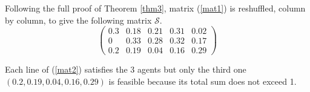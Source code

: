 \documentclass{article}
\begin{document}
Following the full proof of Theorem \ref{thm3},  
matrix (\ref{mat1}) is reshuffled, column by column, to give the following matrix $\mathcal{S}$. 
\begin{equation} \label{mat2}
\left( \begin{array}{ccccc}
0.3 & 0.18 & 0.21 & 0.31& 0.02\\
0 & 0.33 & 0.28& 0.32& 0.17 \\
0.2 & 0.19 & 0.04& 0.16& 0.29   
\end{array} \right) \end{equation}

Each line of (\ref{mat2}) 
satisfies the 3 agents but only the third one  $(0.2 , 0.19 , 0.04, 0.16, 0.29)$ 
is feasible because its total sum does not exceed 1.

\begin{comment}
\commentLaurent{The following is due to Michail Lampis and Nikos Melissinos. Do we keep it for the conference submission?} There is a special case where all the agents can be easily covered. Suppose that there are two values $\alpha$ and $\beta$ such that $0 \le \alpha<\beta \le 1$, and $\dell^i_j \in \{\alpha,\beta\}$ for all pair $(i,j) \in N \times [m]$. 
Let $k$ be the unique integer such that $k \beta+ (m-k) \alpha=1$. The declaration of every agent consists of $k$ coordinates equal to $\beta$ and $(m-k)$ coordinates equal to $\alpha$. 
We claim that an arbitrary solution ${\bf x}$ such that $x_j \in \{\alpha,\beta\}$  for all $j\in [m]$ covers all the agents. Let $i$ be any given agent. If $k \le m/2$, then agent $i$ has reported $\alpha$ for a majority of projects, and $x_j \ge \alpha$ for all the projects, meaning that $i$ is covered. If $k > m/2$, then the vector {\bf x} contains a minority of $\alpha$s. Even if $\dell_j^i$ is equal to $\beta$ for each coordinate $j$ such that $x_j=\alpha$, we know that for all the other coordinates, it holds that $x_j \ge \dell_j^i$ because $x_j= \beta$. Thus, agent $i$ is locally satisfied for a majority of projects, meaning that she is covered. 




\end{comment}
\end{document}
